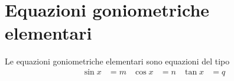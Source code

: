 %
\chapter{Equazioni goniometriche elementari}
\label{sec:EquazioniGoniometricheElementari}
Le equazioni goniometriche elementari sono equazioni del tipo
\begin{align*}
	\sin x&=m&\cos x&=n&\tan x&=q
\end{align*}

